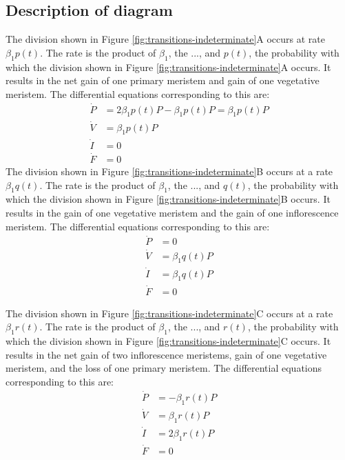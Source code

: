 \documentclass[12pt, oneside]{article}   	%
\begin{document}
\subsection{Description of diagram}

The division shown in Figure \ref{fig:transitions-indeterminate}A occurs at rate $\beta_1 p(t)$. The rate is the product of $\beta_1$, the ..., and $p(t)$, the probability with which the division shown in Figure \ref{fig:transitions-indeterminate}A occurs. It results in the net gain of one primary meristem and gain of one vegetative meristem. The differential equations corresponding to this are:
%
\begin{align}
\dot{P} & = 2 \beta_1 p(t)  P - \beta_1 p(t) P = \beta_1 p(t) P \nonumber \\
\dot{V} & = \beta_1 p(t)  P      \nonumber \\
\dot{I} & = 0  \nonumber \\
\dot{F} & = 0
\end{align}
%
The division shown in Figure \ref{fig:transitions-indeterminate}B occurs at a rate $\beta_1 q(t)$. The rate is the product of $\beta_1$, the ..., and $q(t)$, the probability with which the division shown in Figure \ref{fig:transitions-indeterminate}B occurs. It results in the gain of one vegetative meristem and the gain of one inflorescence meristem. The differential equations corresponding to this are:
%
\begin{align}
\dot{P} & = 0 \nonumber \\
\dot{V} & = \beta_1 q(t) P      \nonumber \\
\dot{I} & =  \beta_1 q(t) P \nonumber \\
\dot{F} & = 0
\end{align}
%

The division shown in Figure \ref{fig:transitions-indeterminate}C occurs at a rate $\beta_1 r(t)$. The rate is the product of $\beta_1$, the ..., and $r(t)$, the probability with which the division shown in Figure \ref{fig:transitions-indeterminate}C occurs. It results in the net gain of two inflorescence meristems, gain of one vegetative meristem, and the loss of one primary meristem. The differential equations corresponding to this are:
%
\begin{align}
\dot{P} & = - \beta_1 r(t) P \nonumber \\
\dot{V} & = \beta_1 r(t)  P      \nonumber \\
\dot{I} & =  2 \beta_1 r(t) P \nonumber \\
\dot{F} & = 0
\end{align}
%
\end{document}
